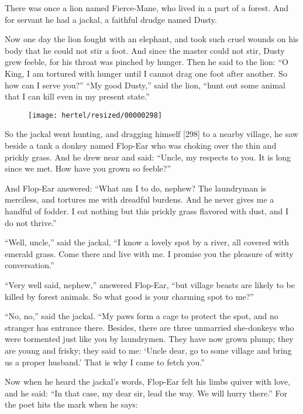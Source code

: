 \documentclass[article, twoside, 10pt]{memoir}
\begin{document}
There was once a lion named Fierce-Mane, who lived in a part of a
forest. And for servant he had a jackal, a faithful drudge named
Dusty.

Now one day the lion fought with an elephant, and took such cruel
wounds on his body that he could not stir a foot. And since the
master could not stir, Dusty grew feeble, for his throat was
pinched by hunger. Then he said to the lion:
``O King, I am tortured with hunger until I cannot drag one foot after another. So how can I serve you?''
``My good Dusty,'' said the lion,
``hunt out some animal that I can kill even in my present state.''

\begin{figure}[p]\texttt{[image: hertel/resized/00000298]}\end{figure}So the jackal went hunting, and dragging himself [298] to a nearby
village, he saw beside a tank a donkey named Flop-Ear who was
choking over the thin and prickly grass. And he drew near and said:
``Uncle, my respects to you. It is long since we met. How have you grown so feeble?''

And Flop-Ear answered:
``What am I to do, nephew? The laundryman is merciless, and tortures me with dreadful burdens. And he never gives me a handful of fodder. I eat nothing but this prickly grass flavored with dust, and I do not thrive.''

``Well, uncle,'' said the jackal,
``I know a lovely spot by a river, all covered with emerald grass. Come there and live with me. I promise you the pleasure of witty conversation.''

``Very well said, nephew,'' answered Flop-Ear,
``but village beasts are likely to be killed by forest animals. So what good is your charming spot to me?''

``No, no,'' said the jackal.
``My paws form a cage to protect the spot, and no stranger has entrance there. Besides, there are three unmarried she-donkeys who were tormented just like you by laundrymen. They have now grown plump; they are young and frisky; they said to me: `Uncle dear, go to some village and bring us a proper husband.' That is why I came to fetch you.''

Now when he heard the jackal's words, Flop-Ear felt his limbs
quiver with love, and he said:
``In that case, my dear sir, lead the way. We will hurry there.''
For the poet hits the mark when he says:
\end{document}
